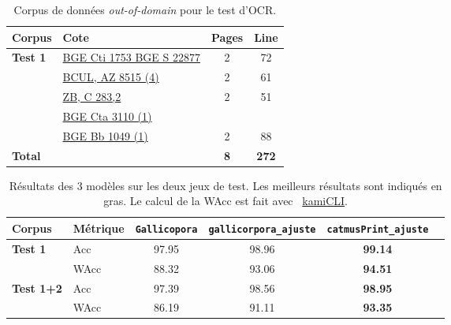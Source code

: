 \documentclass[11pt,french]{article}
\begin{document}
\begin{table}[htp]
    \centering\footnotesize
    \begin{tabular}{l l c c}
        \toprule
        \textbf{Corpus} & \textbf{Cote} & \textbf{Pages} & \textbf{Line} \\
        \midrule
        \multirow{4}{*}{\textbf{Test 1}} 
        & \href{https://doi.org/10.3931/e-rara-6338}{BGE Cti 1753 BGE S 22877}  & 2 & 72 \\ 
        & \href{https://doi.org/10.3931/e-rara-19975}{BCUL, AZ 8515 (4)} & 2 & 61 \\ 
        & \href{https://doi.org/10.3931/e-rara-8160}{ZB, C 283,2} & 2 & 51 \\ 
        \midrule
        \textbf{Test 2} 
         & \href{https://doi.org/10.3931/e-rara-75521}{BGE Cta 3110 (1)} &   &  \\
         & \href{https://doi.org/10.3931/e-rara-75521}{BGE Bb 1049 (1)} & 2 & 88  \\
        \midrule
        \textbf{Total} &  & \textbf{8} & \textbf{272} \\
        \bottomrule
    \end{tabular}
    \caption{Corpus de données \textit{out-of-domain} pour le test d'OCR.}
    \label{tab:example2}
\end{table}


\begin{table}[t]
    \centering
        \begin{tabular}{l|l|c c c c|}
        \toprule
        \textbf{Corpus} & \textbf{Métrique}  & \texttt{Gallicopora}  & \texttt{gallicorpora\_ajuste} & \texttt{catmusPrint\_ajuste} \\
        \midrule
        \multirow{2}{*}{\textbf{Test 1}} 
        & Acc & 97.95 & 98.96 & \textbf{99.14}\\
        & WAcc & 88.32 & 93.06 & \textbf{94.51}\\
        \hline
        \multirow{2}{*}{\textbf{Test 1+2}} 
        & Acc & 97.39 & 98.56 & \textbf{98.95}\\
        & WAcc & 86.19 & 91.11 & \textbf{93.35}\\
        \bottomrule
        \end{tabular}
        \caption{Résultats des 3 modèles sur les deux jeux de test. Les meilleurs résultats sont indiqués en gras. Le calcul de la WAcc est fait avec ~\href{https://github.com/FoNDUE-HTR/kamiCLI}{kamiCLI}.}
        \label{tab:wide_table}
    \end{table}
\end{document}
